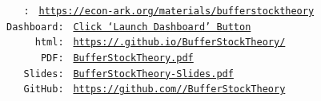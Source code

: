 \documentclass[BufferStockTheory]{subfiles}
\begin{document}
\begin{footnotesize}
  \parbox{0.9\textwidth}{
    \begin{center}
      \begin{tabbing}
        \texttt{~~~\REMARK:~} \= \= \texttt{\url{https://econ-ark.org/materials/bufferstocktheory}} \\ 
        \texttt{Dashboard:~} \> \> \texttt{\href{https://econ-ark.org/materials/bufferstocktheory}{Click `Launch Dashboard' Button}} \\
        \texttt{~~~~~html:~} \> \> \texttt{\href{https://\owner.github.io/BufferStockTheory/}{https://\owner.github.io/BufferStockTheory/}} \\ %
        \texttt{~~~~~~PDF:~} \> \> \texttt{\href{https://github.com/\owner/BufferStockTheory/blob/master/BufferStockTheory.pdf}{BufferStockTheory.pdf}} \\ 
        \texttt{~~~Slides:~} \> \> \texttt{\href{https://github.com/\owner/BufferStockTheory/blob/master/LaTeX/BufferStockTheory-Slides.pdf}{BufferStockTheory-Slides.pdf}} \\
        \texttt{~~~GitHub:~} \> \> \texttt{\href{https://github.com/\owner/BufferStockTheory}{https://github.com/\owner/BufferStockTheory}} \\
      \end{tabbing}
    \end{center}
  } %
\end{footnotesize}

\end{document}
